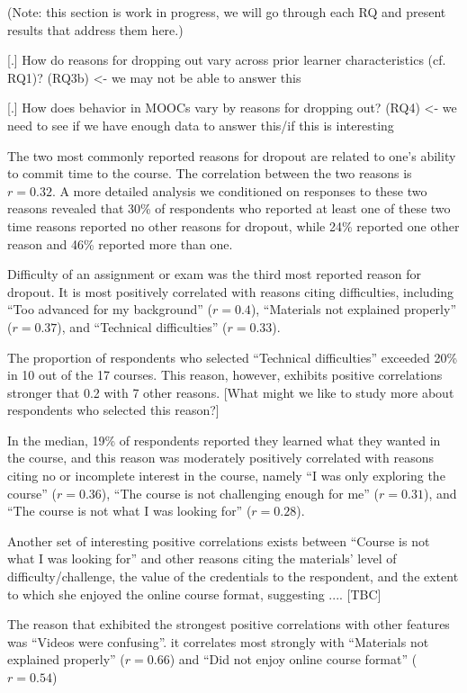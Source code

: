 \documentclass{sigchi}\usepackage[]{graphicx}\usepackage[]{color}
\begin{document}
(Note: this section is work in progress, we will go through each RQ and present results that address them here.)




[.] How do reasons for dropping out vary across prior learner characteristics (cf. RQ1)? (RQ3b) <- we may not be able to answer this
 
[.] How does behavior in MOOCs vary by reasons for dropping out? (RQ4) <- we need to see if we have enough data to answer this/if this is interesting

The two most commonly reported reasons for dropout are related to one's ability to commit time to the course. The correlation between the two reasons is $r=0.32$. A more detailed analysis we conditioned on responses to these two reasons revealed that 30\% of respondents who reported at least one of these two time reasons reported no other reasons for dropout, while 24\% reported one other reason and 46\% reported more than one.

Difficulty of an assignment or exam was the third most reported reason for dropout. It is most positively correlated with reasons citing difficulties, including ``Too advanced for my background'' ($r=0.4$), ``Materials not explained properly'' ($r=0.37$), and ``Technical difficulties'' ($r=0.33$).

The proportion of respondents who selected ``Technical difficulties'' exceeded 20\% in 10 out of the 17 courses. This reason, however, exhibits positive correlations stronger that 0.2 with 7 other reasons. [What might we like to study more about respondents who selected this reason?]

In the median, 19\% of respondents reported they learned what they wanted in the course, and this reason was moderately positively correlated with reasons citing no or incomplete interest in the course, namely ``I was only exploring the course'' ($r=0.36$), ``The course is not challenging enough for me'' ($r=0.31$), and ``The course is not what I was looking for'' ($r=0.28$).

Another set of interesting positive correlations exists between ``Course is not what I was looking for'' and other reasons citing the materials' level of difficulty/challenge, the value of the credentials to the respondent, and the extent to which she enjoyed the online course format, suggesting .... [TBC]

The reason that exhibited the strongest positive correlations with other features was ``Videos were confusing''. it correlates most strongly with ``Materials not explained properly'' ($r=0.66$) and ``Did not enjoy online course format'' ($r=0.54$)
\end{document}
